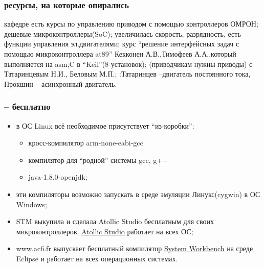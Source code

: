 \documentclass[14pt]{beamer}
\begin{document}
\begin{frame}
\frametitle{ ресурсы, на которые опирались}
\begin{itemize}
	 кафедре есть курсы по управлению приводом с помощью контроллеров ОМРОН; 
	 дешевые микроконтроллеры(SoC); увеличилась скорость, разрядность, есть функции управления эл.двигателями; 
	 курс \enquote{решение интерфейсных задач с помощью микроконтроллера at89} Кекконен А.В.,Тимофеев А.А.,который выполняется на asm,C в ``Keil''(8 установок); 
 (приводчикам нужны приводы) с Татаринцевым Н.И., Беловым М.П.;
:Татаринцев --двигатель постоянного тока, Прокшин -- асинхронный двигатель.  
\end{itemize}
\end{frame}


\begin{frame}
\frametitle{ -- бесплатно}
\begin{itemize}
	\item в ОС Linux всё необходимое присутствует  ``из-коробки'':
		\begin{itemize}
		\item кросс-компилятор arm-none-eabi-gcc
		\item компилятор для ``родной'' системы gcc, g++
		\item  java-1.8.0-openjdk;
		\end{itemize}
	\item эти компиляторы возможно запускать в среде эмуляции Линукс(cygwin) в ОС Windows;
	\item STM выкупила  и сделала Atollic Studio бесплатным
		для своих микроконтроллеров. \href{atollic.com}{Atollic Studio} работает на всех ОС;
	\item www.ac6.fr выпускает бесплатный компилятор \href{www.openstm32.org}{System Workbench} 
на среде Eclipse и работает на всех операционных системах.
\end{itemize}
\end{frame}
\end{document}
